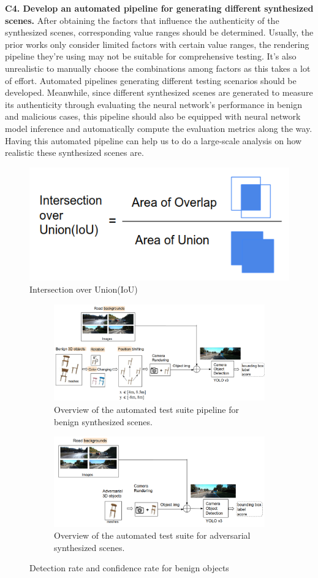 \textbf{C4. Develop an automated pipeline for generating different synthesized scenes. }
After obtaining the factors that influence the authenticity of the synthesized scenes, corresponding value ranges should be determined.
Usually, the prior works only consider limited factors with certain value ranges, 
the rendering pipeline they're using may not be suitable for comprehensive testing.
It's also unrealistic to manually choose the combinations among factors as this takes a lot of effort.
Automated pipelines generating different testing scenarios should be developed.
Meanwhile, since different synthesized scenes are generated to measure its authenticity through evaluating the neural network's performance in benign and malicious cases,
this pipeline should also be equipped with neural network model inference and automatically compute the evaluation metrics along the way.
Having this automated pipeline can help us to do a large-scale analysis on how realistic these synthesized scenes are.

\begin{figure}
	\centering
	\includegraphics[width=0.5\linewidth]{figure/iou.png}
	\caption{Intersection over Union(IoU)}
	\label{fig:iou}
\end{figure}

\begin{figure}
	\centering
	\begin{subfigure}{0.5\textwidth}
		\centering
		\includegraphics[width=0.7\linewidth]{figure/test-pipeline.png}
		\caption{Overview of the automated test suite pipeline for benign synthesized scenes.}
		\label{fig:test-pipe}
	\end{subfigure}%
	\begin{subfigure}{0.5\textwidth}
		\centering
		\includegraphics[width=0.7\linewidth]{figure/test-attack.png}
		\caption{Overview of the automated test suite for adversarial synthesized scenes.}
		\label{fig:test-att}
	\end{subfigure}
	\caption{Detection rate and confidence rate for benign objects}
	\label{fig:pipe}
\end{figure}

